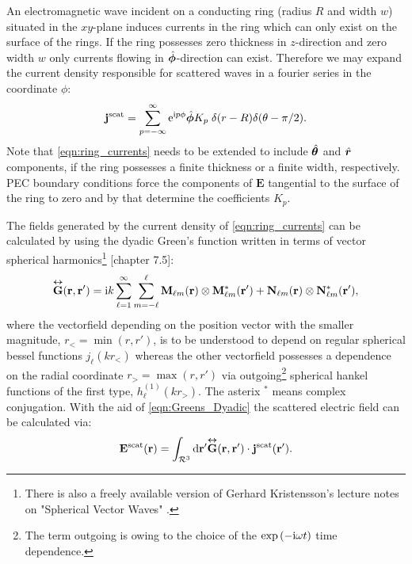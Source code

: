 An electromagnetic wave incident on a conducting ring (radius $R$ and width $w$) situated in the $xy$-plane induces currents in the ring which can only exist on the surface of the rings. If the ring possesses zero thickness in $z$-direction and zero width $w$ only currents flowing in $\hat{\bm{\phi}}$-direction can exist. Therefore we may expand the current density responsible for scattered waves in a fourier series in the coordinate $\phi$:
\begin{equation}
\mathbf{j}^\text{scat} = \sum_{p=-\infty}^\infty \mathrm{e}^{\mathrm{i} p \phi} \hat{\bm{\phi}}K_p\; \delta(r-R) \delta(\theta-\pi/2) .
\label{eqn:ring_currents}
\end{equation}
Note that \cref{eqn:ring_currents} needs to be extended to include $\hat{\bm{\theta}}$ and $\hat{\bm{r}}$ components, if the ring possesses a finite thickness or a finite width, respectively. PEC boundary conditions force the components of $\mathbf{E}$ tangential to the surface of the ring to zero and by that determine the coefficients $K_p$.

The fields generated by the current density of \cref{eqn:ring_currents} can be
calculated by using the dyadic Green's function written in terms of vector spherical harmonics\footnote{There is also a freely available version of Gerhard Kristensson's lecture notes on "Spherical Vector Waves" \citep{Kristensson2014}.} \Cite{Kristensson2016}[chapter 7.5]:
\begin{equation}
\overset{\bm\leftrightarrow}{\mathbf{G}}(\mathbf{r},\mathbf{r}') = \mathrm{i} k \sum_{\ell=1}^\infty \sum_{m=-\ell}^\ell
\mathbf{M}_{\ell m}(\mathbf{r})\otimes\mathbf{M}_{\ell m}^*(\mathbf{r}')+
\mathbf{N}_{\ell m}(\mathbf{r})\otimes\mathbf{N}_{\ell m}^*(\mathbf{r}'),
\label{eqn:Greens_Dyadic}
\end{equation}
where the vectorfield depending on the position vector with the smaller magnitude, $r_<=\min\left(r, r'\right)$, is to be understood to depend on regular spherical bessel functions $j_\ell(kr_<)$ whereas the other vectorfield possesses a dependence on the radial coordinate $r_>=\max\left(r, r'\right)$ via outgoing\footnote{The term outgoing is owing to the choice of the $\exp\left(-\mathrm{i}\omega t\right)$ time dependence.} spherical hankel functions of the first type, $h_\ell^{(1)}(kr_>)$.
The asterix $^*$ means complex conjugation. With the aid of \cref{eqn:Greens_Dyadic} the scattered electric field can be calculated via:
\begin{equation}
\mathbf{E}^\text{scat}(\mathbf{r}) = \int_{\mathcal{R}^3}  \mathrm{d} \mathbf{r}' 
\overset{\bm\leftrightarrow}{\mathbf{G}}(\mathbf{r},\mathbf{r}') \cdot \mathbf{j}^\text{scat}(\mathbf{r}').
\label{eqn:E_scattered}
\end{equation}

